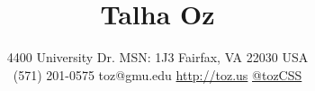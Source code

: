 \documentclass[11pt, letter]{article}
\title{Talha Oz}
\author{4400 University Dr. MSN: 1J3 \textbar{} Fairfax, VA 22030 USA\\ 
(571) 201-0575 \textbar{} toz@gmu.edu \textbar{}
\href{http://toz.us}{http://toz.us} \textbar{}
\href{http://twitter.com/tozCSS}{@tozCSS} }
\date{} %
\begin{document}
\maketitle
\begin{raggedright}
\vspace{-15mm}



\end{raggedright}
\end{document}
